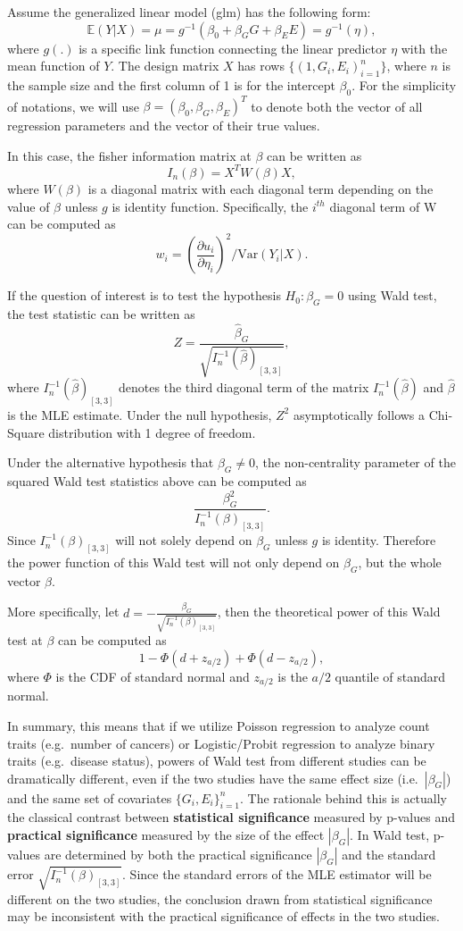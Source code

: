 \documentclass[
]{article}
\begin{document}
Assume the generalized linear model (glm) has the following form:
\[\mathbb{E}(Y|X) = \mu = g^{-1}(\beta_0 + \beta_G G + \beta_E E) = g^{-1}(\eta),\]
where \(g(.)\) is a specific link function connecting the linear
predictor \(\eta\) with the mean function of \(Y\). The design matrix
\(X\) has rows \(\{(1,G_i,E_i)_{i=1}^n\}\), where \(n\) is the sample
size and the first column of 1 is for the intercept \(\beta_0\). For the
simplicity of notations, we will use
\(\beta=(\beta_0,\beta_G,\beta_E)^T\) to denote both the vector of all
regression parameters and the vector of their true values.

In this case, the fisher information matrix at \(\beta\) can be written
as \[I_n(\beta) = X^TW(\beta) X,\] where \(W(\beta)\) is a diagonal
matrix with each diagonal term depending on the value of \(\beta\)
unless \(g\) is identity function. Specifically, the \(i^{th}\) diagonal
term of W can be computed as
\[w_i=(\frac{\partial u_i}{\partial\eta_i})^2/\text{Var}(Y_i|X).\]

If the question of interest is to test the hypothesis \(H_0: \beta_G=0\)
using Wald test, the test statistic can be written as
\[Z = \frac{\hat{\beta}_G}{\sqrt{I_n^{-1}(\hat{\beta})_{[3,3]}}},\]
where \(I_n^{-1}(\hat{\beta})_{[3,3]}\) denotes the third diagonal term
of the matrix \(I_n^{-1}(\hat{\beta})\) and \(\hat{\beta}\) is the MLE
estimate. Under the null hypothesis, \(Z^2\) asymptotically follows a
Chi-Square distribution with 1 degree of freedom.

Under the alternative hypothesis that \(\beta_G \neq 0\), the
non-centrality parameter of the squared Wald test statistics above can
be computed as \[\frac{\beta_G^2}{I_n^{-1}(\beta)_{[3,3]}}.\] Since
\(I_n^{-1}(\beta)_{[3,3]}\) will not solely depend on \(\beta_G\) unless
\(g\) is identity. Therefore the power function of this Wald test will
not only depend on \(\beta_G\), but the whole vector \(\beta\).

More specifically, let
\(d=-\frac{\beta_G}{\sqrt{I_n^{-1}(\beta)_{[3,3]}}}\), then the
theoretical power of this Wald test at \(\beta\) can be computed as
\[1-\Phi(d+z_{a/2})+\Phi(d-z_{a/2}),\] where \(\Phi\) is the CDF of
standard normal and \(z_{a/2}\) is the \(a/2\) quantile of standard
normal.

In summary, this means that if we utilize Poisson regression to analyze
count traits (e.g.~number of cancers) or Logistic/Probit regression to
analyze binary traits (e.g.~disease status), powers of Wald test from
different studies can be dramatically different, even if the two studies
have the same effect size (i.e.~\(|\beta_G|\)) and the same set of
covariates \(\{G_{i},E_{i}\}_{i=1}^n\). The rationale behind this is
actually the classical contrast between
\textbf{statistical significance} measured by p-values and
\textbf{practical significance} measured by the size of the effect
\(|\beta_G|\). In Wald test, p-values are determined by both the
practical significance \(|\beta_G|\) and the standard error
\(\sqrt{I_n^{-1}(\beta)_{[3,3]}}\). Since the standard errors of the MLE
estimator will be different on the two studies, the conclusion drawn
from statistical significance may be inconsistent with the practical
significance of effects in the two studies.
\end{document}

